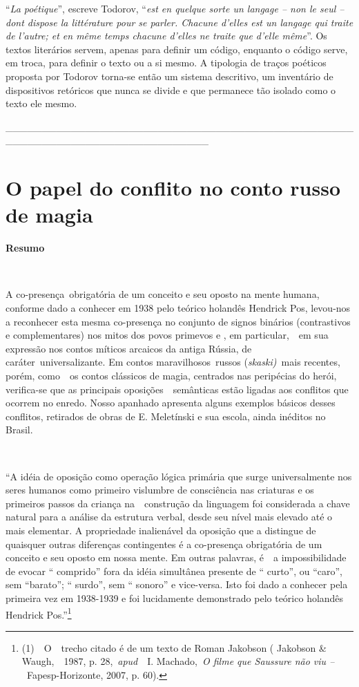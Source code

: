 ``\emph{La poétique}'', escreve Todorov, ``\emph{est en quelque sorte un
langage -- non le seul -- dont dispose la littérature pour se parler.
Chacune d'elles est un langage qui traite de l'autre; et en même temps
chacune d'elles ne traite que d'elle même}''. Os textos literários
servem, apenas para definir um código, enquanto o código serve, em
troca, para definir o texto ou a si mesmo. A tipologia de traços
poéticos proposta por Todorov torna-se então um sistema descritivo, um
inventário de dispositivos retóricos que nunca se divide e que permanece
tão isolado como o texto ele mesmo.

\_\_\_\_\_\_\_\_\_\_\_\_\_\_\_\_\_\_\_\_\_\_\_\_\_\_\_\_\_\_\_\_\_\_\_\_\_\_\_\_\_\_\_\_\_\_\_\_\_\_\_\_\_\_\_\_\_\_\_\_\_\_\_\_\_\_\_\_\_\_\_\_\_\_\_\_

\chapter{O papel do conflito no conto russo de magia}

\textbf{Resumo}

\textbf{~}

A co-presença~obrigatória de um conceito e seu oposto na mente humana,
conforme dado a conhecer em 1938 pelo teórico holandês Hendrick Pos,
levou-nos a reconhecer esta mesma co-presença no conjunto de signos
binários (contrastivos e complementares) nos mitos dos povos primevos e
, em particular,~~em sua expressão nos contos míticos arcaicos da antiga
Rússia, de caráter~universalizante. Em contos maravilhosos~russos
(\emph{skaski)~}mais recentes, porém, como~~os contos clássicos de
magia, centrados nas peripécias do herói, verifica-se que as principais
oposições~~semânticas estão ligadas aos conflitos que ocorrem no enredo.
Nosso apanhado apresenta alguns exemplos básicos desses conflitos,
retirados de obras de E. Meletínski e sua escola, ainda inéditos no
Brasil.

\textbf{~}

``A idéia de oposição como operação lógica primária que surge
universalmente nos seres humanos como primeiro vislumbre de consciência
nas criaturas e os primeiros passos da criança na~~construção da
linguagem foi considerada a chave natural para a análise da estrutura
verbal, desde seu nível mais elevado até o mais elementar. A propriedade
inalienável da oposição que a distingue de quaisquer outras diferenças
contingentes é a co-presença obrigatória de um conceito e seu oposto em
nossa mente. Em outras palavras, é~~a impossibilidade de evocar ``
comprido'' fora da idéia simultânea presente de `` curto'', ou ``caro'',
sem ``barato''; `` surdo'', sem `` sonoro'' e vice-versa. Isto foi dado
a conhecer pela primeira vez em 1938-1939 e foi lucidamente demonstrado
pelo teórico holandês Hendrick Pos.''\footnote{(1)~~O~~trecho citado é
  de um texto de Roman Jakobson ( Jakobson \& Waugh,~~1987, p.
  28,~\emph{apud}~~I. Machado,~\emph{O filme que Saussure não viu
  --~}Fapesp-Horizonte, 2007, p. 60).}

